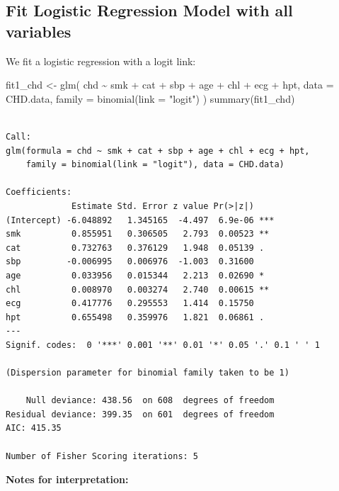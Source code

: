 \documentclass[
  letterpaper,
  DIV=11,
  numbers=noendperiod]{scrreprt}
\newenvironment{Shaded}{\begin{snugshade}}{\end{snugshade}}
\newcommand{\AttributeTok}[1]{\textcolor[rgb]{0.40,0.45,0.13}{#1}}
\newcommand{\FunctionTok}[1]{\textcolor[rgb]{0.28,0.35,0.67}{#1}}
\newcommand{\NormalTok}[1]{\textcolor[rgb]{0.00,0.23,0.31}{#1}}
\newcommand{\OtherTok}[1]{\textcolor[rgb]{0.00,0.23,0.31}{#1}}
\newcommand{\SpecialCharTok}[1]{\textcolor[rgb]{0.37,0.37,0.37}{#1}}
\newcommand{\StringTok}[1]{\textcolor[rgb]{0.13,0.47,0.30}{#1}}
\begin{document}
\subsection{Fit Logistic Regression Model with all
variables}\label{fit-logistic-regression-model-with-all-variables}

We fit a logistic regression with a logit link:

\begin{Shaded}
\begin{Highlighting}[]
\NormalTok{fit1\_chd }\OtherTok{\textless{}{-}} \FunctionTok{glm}\NormalTok{(}
\NormalTok{  chd }\SpecialCharTok{\textasciitilde{}}\NormalTok{ smk }\SpecialCharTok{+}\NormalTok{ cat }\SpecialCharTok{+}\NormalTok{ sbp }\SpecialCharTok{+}\NormalTok{ age }\SpecialCharTok{+}\NormalTok{ chl }\SpecialCharTok{+}\NormalTok{ ecg }\SpecialCharTok{+}\NormalTok{ hpt,}
  \AttributeTok{data =}\NormalTok{ CHD.data,}
  \AttributeTok{family =} \FunctionTok{binomial}\NormalTok{(}\AttributeTok{link =} \StringTok{"logit"}\NormalTok{)}
\NormalTok{)}
\FunctionTok{summary}\NormalTok{(fit1\_chd)}
\end{Highlighting}
\end{Shaded}

\begin{verbatim}

Call:
glm(formula = chd ~ smk + cat + sbp + age + chl + ecg + hpt, 
    family = binomial(link = "logit"), data = CHD.data)

Coefficients:
             Estimate Std. Error z value Pr(>|z|)    
(Intercept) -6.048892   1.345165  -4.497  6.9e-06 ***
smk          0.855951   0.306505   2.793  0.00523 ** 
cat          0.732763   0.376129   1.948  0.05139 .  
sbp         -0.006995   0.006976  -1.003  0.31600    
age          0.033956   0.015344   2.213  0.02690 *  
chl          0.008970   0.003274   2.740  0.00615 ** 
ecg          0.417776   0.295553   1.414  0.15750    
hpt          0.655498   0.359976   1.821  0.06861 .  
---
Signif. codes:  0 '***' 0.001 '**' 0.01 '*' 0.05 '.' 0.1 ' ' 1

(Dispersion parameter for binomial family taken to be 1)

    Null deviance: 438.56  on 608  degrees of freedom
Residual deviance: 399.35  on 601  degrees of freedom
AIC: 415.35

Number of Fisher Scoring iterations: 5
\end{verbatim}

\textbf{Notes for interpretation:}
\end{document}
